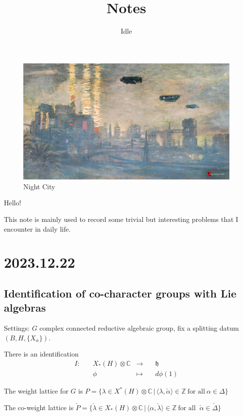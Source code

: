 \documentclass[12pt]{amsart}
\author{Idle}
\numberwithin{equation}{section}
\newcommand{\BC}{{\mathbb {C}}}
\newcommand{\BZ}{{\mathbb {Z}}}
\newcommand{\fh}{\mathfrak{h}}
\newcommand{\set}[2]{\{#1\,|\,#2\}}
\newcommand{\defmap}[5]{
           \begin{equation*}
              \begin{aligned}
                   #1:\quad  & #2 &\longrightarrow &\quad #3 \\
                      \quad  & #4    &\longmapsto  &\quad #5
              \end{aligned}
           \end{equation*}
          }
\begin{document}
\title[Notes]{Notes}
\maketitle
\begin{figure}
  \centering
  \includegraphics[width=1.0\linewidth]{Claude_Monet-NC.jpg}
  \caption{Night City}
  \label{night City}
\end{figure}

Hello!


This note is mainly used to record some trivial
but interesting problems that I encounter
in daily life.


\newpage


\tableofcontents

\newpage

\section{2023.12.22}\label{1}

\subsection{Identification of co-character groups with Lie algebras}
Settings: $G$ complex connected reductive algebraic group, fix a splitting datum
$(B,H,\{X_\alpha\})$.


There is an identification \defmap{I}{X_*(H)\otimes \BC}{\fh}{\phi}{d\phi(1)}


The weight lattice for $G$ is $P = \set{\lambda \in X^*(H)\otimes \BC}{\langle \lambda, \check{\alpha} \rangle \in \BZ \ \textrm{for all} \ \alpha \in \Delta }$


The co-weight lattice is $\check{P} = \set{\check{\lambda} \in X_*(H)\otimes \BC}{\langle\alpha , \check{\lambda} \rangle \in \BZ \ \textrm{for all } \ \check{\alpha} \in \check{\Delta}}$
\end{document}
